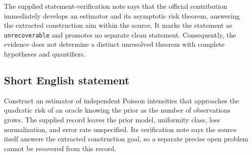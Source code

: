 \documentclass[11pt]{article}
\begin{document}
The supplied statement-verification note says that the official contribution immediately develops an estimator and its asymptotic risk theorem, answering the extracted construction aim within the source. It marks the statement as \texttt{unrecoverable} and promotes no separate clean statement. Consequently, the evidence does not determine a distinct unresolved theorem with complete hypotheses and quantifiers.
\subsection{Short English statement}
Construct an estimator of independent Poisson intensities that approaches the quadratic risk of an oracle knowing the prior as the number of observations grows. The supplied record leaves the prior model, uniformity class, loss normalization, and error rate unspecified. Its verification note says the source itself answers the extracted construction goal, so a separate precise open problem cannot be recovered from this record.
\end{document}
